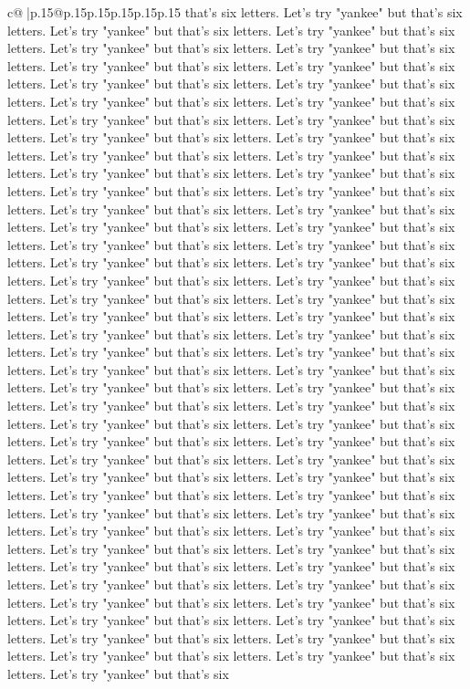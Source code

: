 \documentclass{article}
\begin{document}
{\begin{supertabular}{c@{$\;$}|p{.15\linewidth}@{}p{.15\linewidth}p{.15\linewidth}p{.15\linewidth}p{.15\linewidth}p{.15\linewidth}}
{{{that's six letters. Let's try "yankee" but that's six letters. Let's try "yankee" but that's six letters. Let's try "yankee" but that's six letters. Let's try "yankee" but that's six letters. Let's try "yankee" but that's six letters. Let's try "yankee" but that's six letters. Let's try "yankee" but that's six letters. Let's try "yankee" but that's six letters. Let's try "yankee" but that's six letters. Let's try "yankee" but that's six letters. Let's try "yankee" but that's six letters. Let's try "yankee" but that's six letters. Let's try "yankee" but that's six letters. Let's try "yankee" but that's six letters. Let's try "yankee" but that's six letters. Let's try "yankee" but that's six letters. Let's try "yankee" but that's six letters. Let's try "yankee" but that's six letters. Let's try "yankee" but that's six letters. Let's try "yankee" but that's six letters. Let's try "yankee" but that's six letters. Let's try "yankee" but that's six letters. Let's try "yankee" but that's six letters. Let's try "yankee" but that's six letters. Let's try "yankee" but that's six letters. Let's try "yankee" but that's six letters. Let's try "yankee" but that's six letters. Let's try "yankee" but that's six letters. Let's try "yankee" but that's six letters. Let's try "yankee" but that's six letters. Let's try "yankee" but that's six letters. Let's try "yankee" but that's six letters. Let's try "yankee" but that's six letters. Let's try "yankee" but that's six letters. Let's try "yankee" but that's six letters. Let's try "yankee" but that's six letters. Let's try "yankee" but that's six letters. Let's try "yankee" but that's six letters. Let's try "yankee" but that's six letters. Let's try "yankee" but that's six letters. Let's try "yankee" but that's six letters. Let's try "yankee" but that's six letters. Let's try "yankee" but that's six letters. Let's try "yankee" but that's six letters. Let's try "yankee" but that's six letters. Let's try "yankee" but that's six letters. Let's try "yankee" but that's six letters. Let's try "yankee" but that's six letters. Let's try "yankee" but that's six letters. Let's try "yankee" but that's six letters. Let's try "yankee" but that's six letters. Let's try "yankee" but that's six letters. Let's try "yankee" but that's six letters. Let's try "yankee" but that's six letters. Let's try "yankee" but that's six letters. Let's try "yankee" but that's six letters. Let's try "yankee" but that's six letters. Let's try "yankee" but that's six letters. Let's try "yankee" but that's six letters. Let's try "yankee" but that's six letters. Let's try "yankee" but that's six letters. Let's try "yankee" but that's six letters. Let's try "yankee" but that's six letters. Let's try "yankee" but that's six letters. Let's try "yankee" but that's six letters. Let's try "yankee" but that's six letters. Let's try "yankee" but that's six letters. Let's try "yankee" but that's six letters. Let's try "yankee" but that's six letters. Let's try "yankee" but that's six letters. Let's try "yankee" but that's six letters. Let's try "yankee" but that's six letters. Let's try "yankee" but that's six letters. Let's try "yankee" but that's six }}}
\end{supertabular}}
\end{document}
